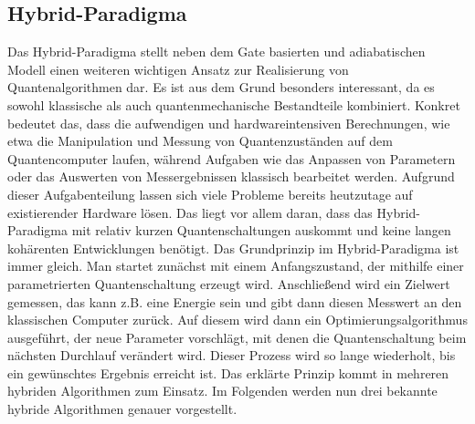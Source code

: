 \subsection{Hybrid-Paradigma}
Das Hybrid-Paradigma stellt neben dem Gate basierten und adiabatischen Modell einen weiteren wichtigen Ansatz zur Realisierung von Quantenalgorithmen dar. Es ist aus dem Grund besonders interessant, da es sowohl klassische als auch quantenmechanische Bestandteile kombiniert. Konkret bedeutet das, dass die aufwendigen und hardwareintensiven Berechnungen, wie etwa die Manipulation und Messung von Quantenzuständen auf dem Quantencomputer laufen, während Aufgaben wie das Anpassen von Parametern oder das Auswerten von Messergebnissen klassisch bearbeitet werden. Aufgrund dieser Aufgabenteilung lassen sich viele Probleme bereits heutzutage auf existierender Hardware lösen. Das liegt vor allem daran, dass das Hybrid-Paradigma mit relativ kurzen Quantenschaltungen auskommt und keine langen kohärenten Entwicklungen benötigt. \autocite[1-2]{cerezo_variational_nodate}
Das Grundprinzip im Hybrid-Paradigma ist immer gleich. Man startet zunächst mit einem Anfangszustand, der mithilfe einer parametrierten Quantenschaltung erzeugt wird. Anschließend wird ein Zielwert gemessen, das kann z.B. eine Energie sein und gibt dann diesen Messwert an den klassischen Computer zurück. Auf diesem wird dann ein Optimierungsalgorithmus ausgeführt, der neue Parameter vorschlägt, mit denen die Quantenschaltung beim nächsten Durchlauf verändert wird. Dieser Prozess wird so lange wiederholt, bis ein gewünschtes Ergebnis erreicht ist. Das erklärte Prinzip kommt in mehreren hybriden Algorithmen zum Einsatz. Im Folgenden werden nun drei bekannte hybride Algorithmen genauer vorgestellt. 
